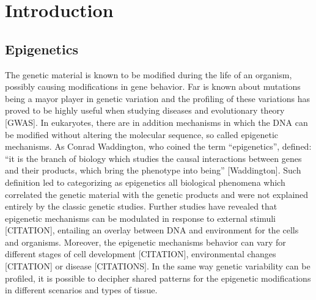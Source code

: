 
\chapter{Introduction}\label{Intro}   %


\section{Epigenetics}

The genetic material is known to be modified during the life of an organism, possibly causing modifications in gene behavior. Far is known about mutations being a mayor player in genetic variation and the profiling of these variations has proved to be highly useful when studying diseases and evolutionary theory [GWAS]. In eukaryotes, there are in addition mechanisms in which the DNA can be modified without altering the molecular sequence, so called epigenetic mechanisms. As Conrad Waddington, who coined the term ``epigenetics'', defined: ``it is the branch of biology which studies the causal interactions between genes and their products, which bring the phenotype into being'' [Waddington]. Such definition led to categorizing as epigenetics all biological phenomena which correlated the genetic material with the genetic products and were not explained entirely by the classic genetic studies. Further studies have revealed that epigenetic mechanisms can be modulated in response to external stimuli [CITATION], entailing an overlay between DNA  and environment for the cells and organisms. Moreover, the epigenetic mechanisms behavior can vary for different stages of cell development [CITATION], environmental changes [CITATION] or disease [CITATIONS]. In the same way genetic variability can be profiled, it is possible to decipher shared patterns for the epigenetic modifications in different scenarios and types of tissue.

\medskip

